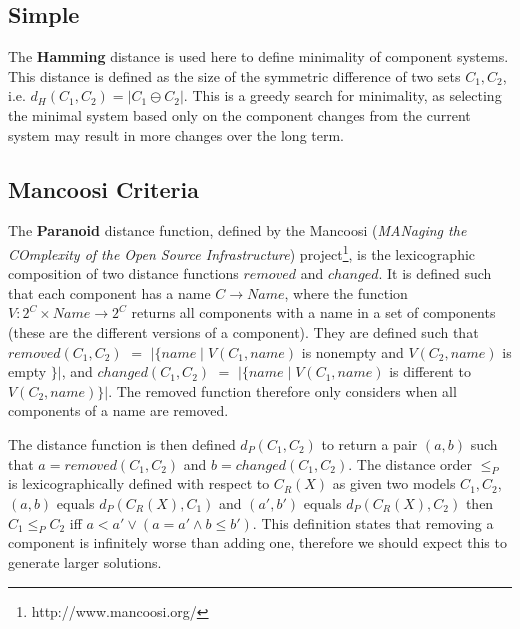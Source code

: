 \subsection{Simple}
The \textbf{Hamming} distance \cite{hamming1950error} is used here to define minimality of component systems.
This distance is defined as the size of the symmetric difference of two sets $C_1,C_2$, 
i.e. $d_H(C_1,C_2) = |C_1 \ominus C_2|$.
This is a greedy search for minimality, 
as selecting the minimal system based only on the component changes from the current system may result in more changes over the long term.


\subsection{Mancoosi Criteria}






The \textbf{Paranoid} distance function, 
defined by the Mancoosi (\textit{MANaging the COmplexity of the Open Source Infrastructure}) project\footnote{http://www.mancoosi.org/}, 
is the lexicographic composition of two distance functions $removed$ and $changed$.
It is defined such that each component has a name $C \rightarrow Name$,
where the function $V: 2^C \times Name \rightarrow 2^C$ returns all components with a name in a set of components 
(these are the different versions of a component).
They are defined such that $removed(C_1,C_2)$ $=$ $|\{name \mid V(C_1,name) $ is nonempty and $V(C_2,name)$ is empty $\}|$,
and $changed(C_1,C_2)$ $=$ $|\{name \mid V(C_1,name)$ is different to $V(C_2,name)\}|$.
The removed function therefore only considers when all components of a name are removed. 

The distance function is then defined $d_P(C_1,C_2)$ to return a pair $(a,b)$ such that $a = removed(C_1,C_2)$ and $b = changed(C_1,C_2)$.
The distance order $\leq_{P}$ is lexicographically defined with respect to $C_R(X)$ as given two models $C_1,C_2$,
$(a,b)$ equals $d_P(C_R(X),C_1)$ and $(a',b')$ equals $d_P(C_R(X),C_2)$ then
$C_1 \leq_{P} C_2 $ iff $a < a' \vee (a = a' \wedge b \leq b')$.
This definition states that removing a component is infinitely worse than adding one, 
therefore we should expect this to generate larger solutions.

